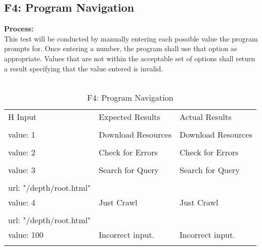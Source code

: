 \documentclass[12pt, titlepage]{article}
\begin{document}
\pagebreak

\subsection{F4: Program Navigation}
\textbf{Process:}\\
This test will be conducted by manually entering each possible value the program prompts for. Once entering a number, the program shall use that option as appropriate. Values that are not within the acceptable set of options shall return a result specifying that the value entered is invalid.\\\\
\begin{table}[h!]
\centering
\begin{tabular}{ p{7cm}  p{4cm}  p{4cm} }{H}
	Input &Expected Results &Actual Results\\\\ \hline
	value: 1  &Download Resources& Download Resources\\\\ \hline
	value: 2  &Check for Errors & Check for Errors \\\\ \hline
         value: 3 & Search for Query & Search for Query \\\\ \hline
	url: "/depth/root.html"\\
	value: 4 & Just Crawl & Just Crawl \\\\ \hline
	url: "/depth/root.html"\\
	value: 100 &Incorrect input. & Incorrect input.\\\\ \hline
\end{tabular}
\caption{F4: Program Navigation}
\label{table:F4: Program Navigation}
\end{table}

\pagebreak
\end{document}
